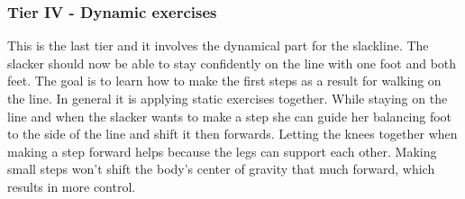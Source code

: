 \subsubsection{Tier IV - Dynamic exercises}
This is the last tier and it involves the dynamical part for the slackline. The slacker should now be able to stay confidently on the line with one foot and both feet. The goal is to learn how to make the first steps as a result for walking on the line. In general it is applying static exercises together. While staying on the line and when the slacker wants to make a step she can guide her balancing foot to the side of the line and shift it then forwards. Letting the knees together when making a step forward helps because the legs can support each other. Making small steps won't shift the body's center of gravity that much forward, which results in more control.
